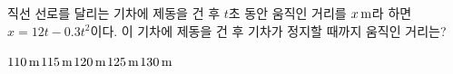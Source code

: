 직선 선로를 달리는 기차에 제동을 건 후 $t$초 동안 움직인 거리를 $x\mkern3mu \mathrm{m}$라 하면 $x=12t-0.3t^2$이다. 이 기차에 제동을 건 후 기차가 정지할 때까지 움직인 거리는?
\begin{choices32}{$110\mkern3mu \mathrm{m}$}{$115\mkern3mu \mathrm{m}$}{$120\mkern3mu \mathrm{m}$}{$125\mkern3mu \mathrm{m}$}{$130\mkern3mu \mathrm{m}$}\end{choices32}
